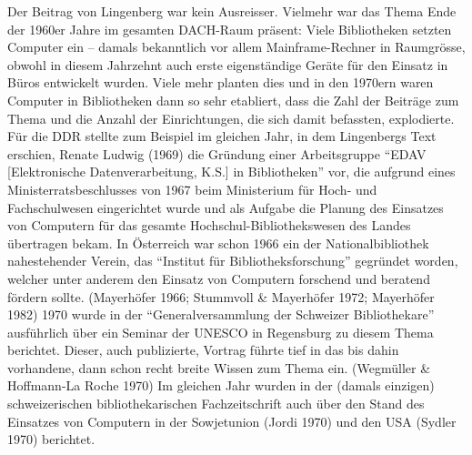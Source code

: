 \documentclass[a4paper,
fontsize=11pt,
oneside,
numbers=noperiodatend,
parskip=half-,
bibliography=totoc,
final
]{scrartcl}
\begin{document}
Der Beitrag von Lingenberg war kein Ausreisser. Vielmehr war das Thema
Ende der 1960er Jahre im gesamten DACH-Raum präsent: Viele Bibliotheken
setzten Computer ein -- damals bekanntlich vor allem Mainframe-Rechner
in Raumgrösse, obwohl in diesem Jahrzehnt auch erste eigenständige
Geräte für den Einsatz in Büros entwickelt wurden. Viele mehr planten
dies und in den 1970ern waren Computer in Bibliotheken dann so sehr
etabliert, dass die Zahl der Beiträge zum Thema und die Anzahl der
Einrichtungen, die sich damit befassten, explodierte. Für die DDR
stellte zum Beispiel im gleichen Jahr, in dem Lingenbergs Text erschien,
Renate Ludwig (1969) die Gründung einer Arbeitsgruppe \enquote{EDAV
{[}Elektronische Datenverarbeitung, K.S.{]} in Bibliotheken} vor, die
aufgrund eines Ministerratsbeschlusses von 1967 beim Ministerium für
Hoch- und Fachschulwesen eingerichtet wurde und als Aufgabe die Planung
des Einsatzes von Computern für das gesamte Hochschul-Bibliothekswesen
des Landes übertragen bekam. In Österreich war schon 1966 ein der
Nationalbibliothek nahestehender Verein, das \enquote{Institut für
Bibliotheksforschung} gegründet worden, welcher unter anderem den
Einsatz von Computern forschend und beratend fördern sollte. (Mayerhöfer
1966; Stummvoll \& Mayerhöfer 1972; Mayerhöfer 1982) 1970 wurde in der
\enquote{Generalversammlung der Schweizer Bibliothekare} ausführlich über ein
Seminar der UNESCO in Regensburg zu diesem Thema berichtet. Dieser, auch
publizierte, Vortrag führte tief in das bis dahin vorhandene, dann schon
recht breite Wissen zum Thema ein. (Wegmüller \& Hoffmann-La Roche 1970)
Im gleichen Jahr wurden in der (damals einzigen) schweizerischen
bibliothekarischen Fachzeitschrift auch über den Stand des Einsatzes von
Computern in der Sowjetunion (Jordi 1970) und den USA (Sydler 1970)
berichtet.
\end{document}
